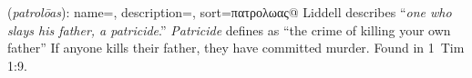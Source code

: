 \item[Father-murderer,]

(\textit{patrolōas}):
{
    name=,
    description={},
    sort=πατρολωας@
}
Liddell describes ``\emph{one who slays his father, a patricide}.'' \emph{Patricide} defines as ``the crime of killing your own father'' If anyone kills their father, they have committed murder.
Found in 1~Tim 1:9.
